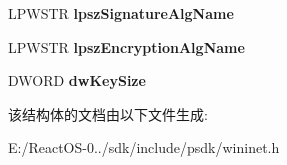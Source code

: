 \begin{DoxyCompactItemize}
L\+P\+W\+S\+TR {\bfseries lpsz\+Signature\+Alg\+Name}
\item 
\mbox{\label{struct_i_n_t_e_r_n_e_t___c_e_r_t_i_f_i_c_a_t_e___i_n_f_o_w_aaf3afee2a1b062fc041d6216efb52c0f}} 
L\+P\+W\+S\+TR {\bfseries lpsz\+Encryption\+Alg\+Name}
\item 
\mbox{\label{struct_i_n_t_e_r_n_e_t___c_e_r_t_i_f_i_c_a_t_e___i_n_f_o_w_a963e0903ac78d3d23a99cb70b14cc041}} 
D\+W\+O\+RD {\bfseries dw\+Key\+Size}
\end{DoxyCompactItemize}


该结构体的文档由以下文件生成\+:\begin{DoxyCompactItemize}
\item 
E\+:/\+React\+O\+S-\/0../sdk/include/psdk/wininet.\+h\end{DoxyCompactItemize}
